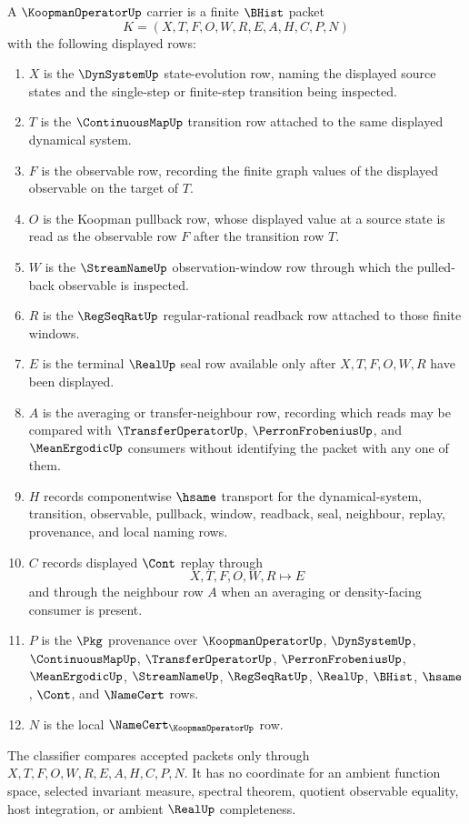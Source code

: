 \begin{definition}
\label{def:koopman-operator-carrier}
A $\KoopmanOperatorUp$ carrier is a finite $\BHist$ packet
$$
K=(X,T,F,O,W,R,E,A,H,C,P,N)
$$
with the following displayed rows:
\begin{enumerate}
\item $X$ is the $\DynSystemUp$ state-evolution row, naming the displayed source states and the single-step or finite-step transition being inspected.
\item $T$ is the $\ContinuousMapUp$ transition row attached to the same displayed dynamical system.
\item $F$ is the observable row, recording the finite graph values of the displayed observable on the target of $T$.
\item $O$ is the Koopman pullback row, whose displayed value at a source state is read as the observable row $F$ after the transition row $T$.
\item $W$ is the $\StreamNameUp$ observation-window row through which the pulled-back observable is inspected.
\item $R$ is the $\RegSeqRatUp$ regular-rational readback row attached to those finite windows.
\item $E$ is the terminal $\RealUp$ seal row available only after $X,T,F,O,W,R$ have been displayed.
\item $A$ is the averaging or transfer-neighbour row, recording which reads may be compared with $\TransferOperatorUp$, $\PerronFrobeniusUp$, and $\MeanErgodicUp$ consumers without identifying the packet with any one of them.
\item $H$ records componentwise $\hsame$ transport for the dynamical-system, transition, observable, pullback, window, readback, seal, neighbour, replay, provenance, and local naming rows.
\item $C$ records displayed $\Cont$ replay through
$$
X,T,F,O,W,R \longmapsto E
$$
and through the neighbour row $A$ when an averaging or density-facing consumer is present.
\item $P$ is the $\Pkg$ provenance over $\KoopmanOperatorUp$, $\DynSystemUp$, $\ContinuousMapUp$, $\TransferOperatorUp$, $\PerronFrobeniusUp$, $\MeanErgodicUp$, $\StreamNameUp$, $\RegSeqRatUp$, $\RealUp$, $\BHist$, $\hsame$, $\Cont$, and $\NameCert$ rows.
\item $N$ is the local $\NameCert_{\KoopmanOperatorUp}$ row.
\end{enumerate}
The classifier compares accepted packets only through $X,T,F,O,W,R,E,A,H,C,P,N$. It has no coordinate for an ambient function space, selected invariant measure, spectral theorem, quotient observable equality, host integration, or ambient $\RealUp$ completeness.
\end{definition}

